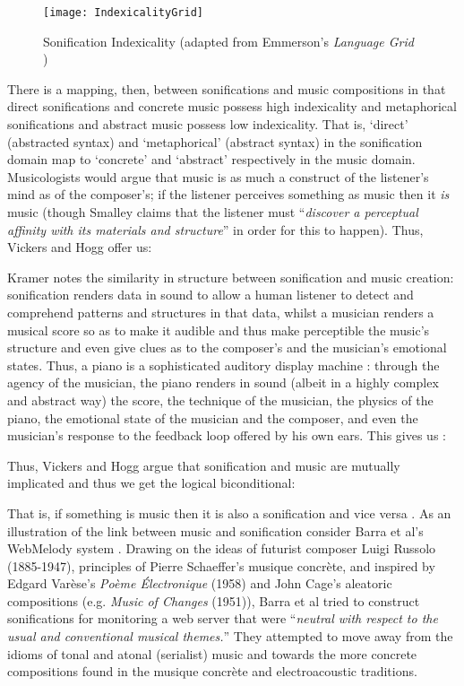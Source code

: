 \documentclass[runningheads]{llncs}
\begin{document}
\begin{figure}[hbt] 
\centering
\texttt{[image: IndexicalityGrid]} 
\caption{Sonification Indexicality (adapted from Emmerson's \emph{Language Grid} \cite{Emmerson:1986})} \label{fig:indexgrid} 
\end{figure} 
There is a mapping, then, between sonifications and music compositions in that direct sonifications and concrete music possess high indexicality and metaphorical sonifications and abstract music possess low indexicality. That is, `direct' (abstracted syntax) and `metaphorical' (abstract syntax) in the sonification domain map to `concrete' and `abstract' respectively in the music domain. Musicologists would argue that music is as much a construct of the listener’s mind as of the composer's; if the listener perceives something as music then it \emph{is} music (though Smalley \cite{Smalley:1986} claims that the listener must  ``\textit{discover a perceptual affinity with its materials and structure}'' in order for this to happen). Thus, Vickers and Hogg \cite{Vickers:2006a} offer us:
\begin{lemma} \end{lemma}
Kramer \cite{Kramer:1994b} notes the similarity in structure between sonification and music creation: sonification renders data in sound to allow a human listener to detect and comprehend patterns and structures in that data, whilst a musician renders a musical score so as to make it audible and thus make perceptible the music's structure and even give clues as to the composer's and the musician's emotional states. Thus, a piano is a sophisticated auditory display machine \cite{Vickers:2006a}: through the agency of the musician, the piano renders in sound (albeit in a highly complex and abstract way) the score, the technique of the musician, the physics of the piano, the emotional state of the musician and the composer, and even the musician's response to the feedback loop offered by his own ears. This gives us \cite{Vickers:2006a}:
\begin{lemma}\end{lemma}
Thus, Vickers and Hogg \cite{Vickers:2006a} argue that sonification and music are mutually implicated and thus we get the logical biconditional:
\begin{lemma}\end{lemma}
That is, if something is music then it is also a sonification and vice versa \cite{Vickers:2006a}. As an illustration of the link between music and sonification consider Barra et al's {\sc WebMelody} system \cite{Barra:2002}. Drawing on the ideas of futurist composer Luigi Russolo (1885-1947), principles of Pierre Schaeffer's musique concrète, and inspired by Edgard Varèse's \textit{Poème Électronique} (1958) and John Cage's aleatoric compositions (e.g. \textit{Music of Changes} (1951)), Barra et al \cite{Barra:2002} tried to construct sonifications for monitoring a web server that were ``\textit{neutral with respect to the usual and conventional musical themes.}'' They attempted to move away from the idioms of tonal and atonal (serialist) music and towards the more concrete compositions found in the musique concrète and electroacoustic traditions. 
\end{document}
